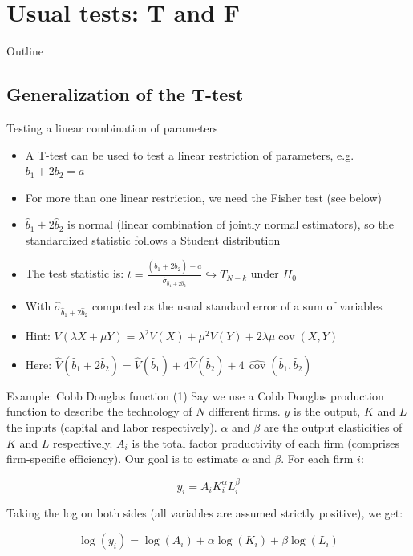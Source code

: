 \documentclass[aspectratio=169]{beamer}
\begin{document}
\section{Usual tests: T and F}

\begin{frame}{Outline}
\end{frame}

\subsection{Generalization of the T-test}

\begin{frame}{Testing a linear combination of parameters}
\begin{itemize}
    \item A T-test can be used to test a linear restriction of parameters, e.g.\ $b_1 + 2b_2 = a$
    \item For more than one linear restriction, we need the Fisher test (see below)
    \item $\hat{b}_1 + 2\hat{b}_2$ is normal (linear combination of jointly normal estimators), so the standardized statistic follows a Student distribution
    \item The test statistic is: $t = \frac{(\hat{b}_1 + 2\hat{b}_2) - a}{\hat{\sigma}_{\hat{b}_1 + 2\hat{b}_2}} \hookrightarrow T_{N-k}$ under $H_0$
    \item With $\hat{\sigma}_{\hat{b}_1 + 2\hat{b}_2}$ computed as the usual standard error of a sum of variables
    \item Hint: $V(\lambda X + \mu Y) = \lambda^2V(X) + \mu^2V(Y) + 2\lambda\mu \operatorname{cov}(X,Y)$
    \item Here: $\hat{V}(\hat{b}_1 + 2\hat{b}_2) = \hat{V}(\hat{b}_1) + 4\hat{V}(\hat{b}_2) + 4\,\widehat{\operatorname{cov}}(\hat{b}_1, \hat{b}_2)$
\end{itemize}
\end{frame}

\begin{frame}{Example: Cobb Douglas function (1)}
Say we use a Cobb Douglas production function to describe the technology of $N$ different firms. $y$ is the output, $K$ and $L$ the inputs (capital and labor respectively). $\alpha$ and $\beta$ are the output elasticities of $K$ and $L$ respectively. $A_i$ is the total factor productivity of each firm (comprises firm-specific efficiency). Our goal is to estimate $\alpha$ and $\beta$. For each firm $i$:

\[
y_i = A_i K_i^{\alpha} L_i^{\beta}
\]

Taking the log on both sides (all variables are assumed strictly positive), we get:

\[
\log(y_i) = \log(A_i) + \alpha \log(K_i) + \beta \log(L_i)
\]
\end{frame}
\end{document}
